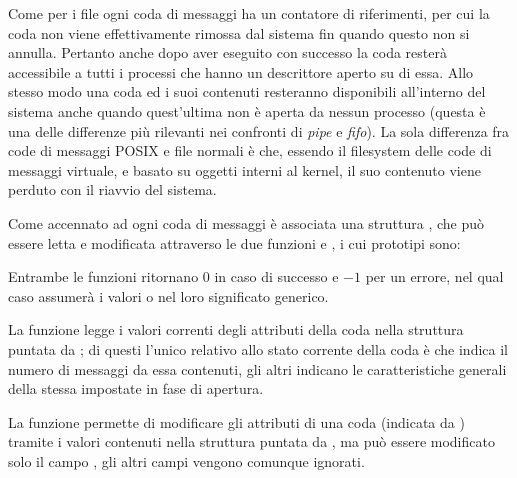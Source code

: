 
Come per i file ogni coda di messaggi ha un contatore di riferimenti, per cui
la coda non viene effettivamente rimossa dal sistema fin quando questo non si
annulla. Pertanto anche dopo aver eseguito con successo  la
coda resterà accessibile a tutti i processi che hanno un descrittore aperto su
di essa.  Allo stesso modo una coda ed i suoi contenuti resteranno disponibili
all'interno del sistema anche quando quest'ultima non è aperta da nessun
processo (questa è una delle differenze più rilevanti nei confronti di
\textit{pipe} e \textit{fifo}).  La sola differenza fra code di messaggi POSIX
e file normali è che, essendo il filesystem delle code di messaggi virtuale, e
basato su oggetti interni al kernel, il suo contenuto viene perduto con il
riavvio del sistema.

Come accennato ad ogni coda di messaggi è associata una struttura
, che può essere letta e modificata attraverso le due
funzioni  e , i cui prototipi sono:

\begin{funcproto}{
}
{
Entrambe le funzioni ritornano $0$ in caso di successo e $-1$ per un errore,
  nel qual caso  assumerà i valori 
    o  nel loro significato generico.
}  
\end{funcproto}

La funzione  legge i valori correnti degli attributi della
coda  nella struttura  puntata
da ; di questi l'unico relativo allo stato corrente della coda è
 che indica il numero di messaggi da essa contenuti, gli
altri indicano le caratteristiche generali della stessa impostate in fase di
apertura.

La funzione  permette di modificare gli attributi di una
coda (indicata da ) tramite i valori contenuti nella struttura
 puntata da , ma può essere modificato solo il
campo , gli altri campi vengono comunque ignorati.

